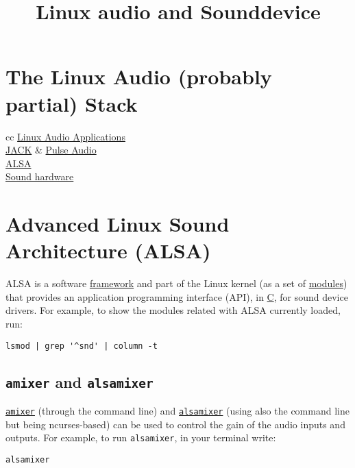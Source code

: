 
\title{Linux audio and Sounddevice}

\maketitle

\section{The Linux Audio (probably partial) Stack}
\begin{tabular}{cc}
\href{https://en.wikipedia.org/wiki/List_of_Linux_audio_software}{Linux
  Audio Applications} \\ \href{https://jackaudio.org/}{JACK} &
\href{https://www.freedesktop.org/wiki/Software/PulseAudio/}{Pulse
  Audio}
\\ \href{https://www.alsa-project.org}{ALSA}
\\ \href{https://www.alsa-project.org/wiki/Matrix:Main}{Sound
  hardware}
\end{tabular}

\section{Advanced Linux Sound Architecture (ALSA)}
ALSA is a software
\href{https://docs.kernel.org/sound/kernel-api/index.html}{framework}
and part of the Linux kernel (as a set of
\href{https://wiki.archlinux.org/title/Kernel_module}{modules}) that
provides an application programming interface (API), in
\href{https://en.wikipedia.org/wiki/C_(programming_language)}{C}, for
sound device drivers. For example, to show the modules related with
ALSA currently loaded, run:
\begin{verbatim}
lsmod | grep '^snd' | column -t
\end{verbatim}

\subsection{\texttt{amixer} and \texttt{alsamixer}}
\texttt{\href{https://linux.die.net/man/1/amixer}{amixer}} (through the command line) and \texttt{\href{https://en.wikipedia.org/wiki/Alsamixer}{alsamixer}} (using also the command line but being ncurses-based) can be used to control the gain of the audio inputs and outputs. For example, to run \texttt{alsamixer}, in your terminal write:
\begin{verbatim}
alsamixer
\end{verbatim}


